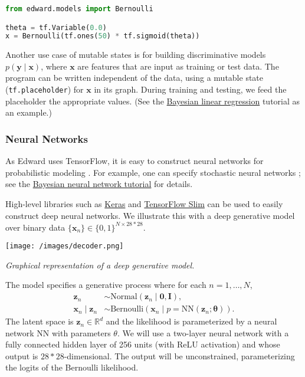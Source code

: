 \begin{lstlisting}[language=python]
from edward.models import Bernoulli

theta = tf.Variable(0.0)
x = Bernoulli(tf.ones(50) * tf.sigmoid(theta))
\end{lstlisting}

Another use case of mutable states is for building discriminative
models $p(\mathbf{y}\mid\mathbf{x})$, where $\mathbf{x}$ are features
that are input as training or test data. The program can be written
independent of the data, using a mutable state
(\texttt{tf.placeholder}) for $\mathbf{x}$ in its graph. During
training and testing, we feed the placeholder the appropriate values.
(See the
\href{/tutorials/supervised-regression}{Bayesian linear
regression} tutorial as an example.)

\subsubsection{Neural Networks}

As Edward uses TensorFlow, it is easy to construct neural networks for
probabilistic modeling \citep{rumelhart1988parallel}.
For example, one can specify stochastic neural networks
\citep{neal1990learning}; see the
\href{/tutorials/bayesian-neural-network}{Bayesian neural network tutorial}
for details.

High-level libraries such as
\href{http://keras.io}{Keras} and
\href{https://github.com/tensorflow/tensorflow/tree/master/tensorflow/contrib/slim}{TensorFlow Slim}
can be used to easily construct deep neural networks.
We illustrate this with a deep generative model over binary data
$\{\mathbf{x}_n\}\in\{0,1\}^{N\times 28*28}$.

\texttt{[image: /images/decoder.png]}

{\small\textit{Graphical representation of a deep generative model.}}

The model specifies a generative process where for each
$n=1,\ldots,N$,
%
\begin{align*}
\mathbf{z}_n &\sim \text{Normal}(\mathbf{z}_n \mid \mathbf{0}, \mathbf{I}), \\[1.5ex]
\mathbf{x}_n\mid \mathbf{z}_n &\sim \text{Bernoulli}(\mathbf{x}_n\mid
p=\mathrm{NN}(\mathbf{z}_n; \mathbf{\theta})).
\end{align*}
%
The latent space is $\mathbf{z}_n\in\mathbb{R}^d$ and the
likelihood is parameterized by a neural network $\mathrm{NN}$ with
parameters $\theta$. We will use a two-layer neural network with a
fully connected hidden layer of 256 units (with ReLU activation) and
whose output is $28*28$-dimensional. The output will be unconstrained,
parameterizing the logits of the Bernoulli likelihood.

